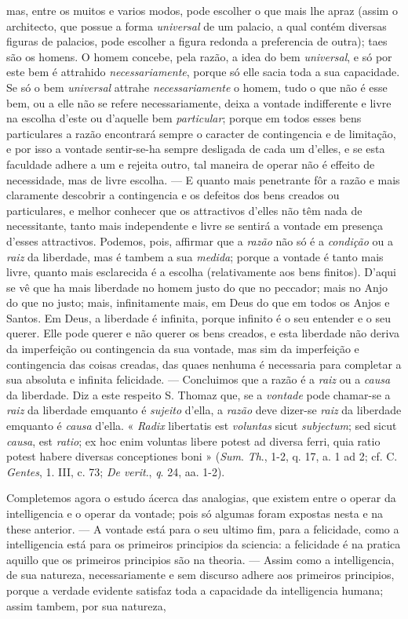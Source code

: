 mas, entre os muitos e varios modos, pode escolher o que mais lhe apraz (assim o architecto, que possue a forma \emph{universal} de um palacio, a qual contém diversas figuras de palacios, pode escolher a figura redonda a preferencia de outra); taes são os homens. O homem concebe, pela razão, a idea do bem \emph{universal}, e só por este bem é attrahido \emph{necessariamente}, porque só elle sacia toda a sua capacidade. Se só o bem \emph{universal} attrahe \emph{necessariamente} o homem, tudo o que não é esse bem, ou a elle não se refere necessariamente, deixa a vontade indifferente e livre na escolha d'este ou d'aquelle bem \emph{particular}; porque em todos esses bens particulares a razão encontrará sempre o caracter de contingencia e de limitação, e por isso a vontade sentir-se-ha sempre desligada de cada um d'elles, e se esta faculdade adhere a um e rejeita outro, tal maneira de operar não é effeito de necessidade, mas de livre escolha. --- E quanto mais penetrante fôr a razão e mais claramente descobrir a contingencia e os defeitos dos bens creados ou particulares, e melhor conhecer que os attractivos d'elles não têm nada de necessitante, tanto mais independente e livre se sentirá a vontade em presença d'esses attractivos. Podemos, pois, affirmar que a \emph{razão} não só é a \emph{condição} ou a \emph{raiz} da liberdade, mas é tambem a sua \emph{medida}; porque a vontade é tanto mais livre, quanto mais esclarecida é a escolha (relativamente aos bens finitos). D'aqui se vê que ha mais liberdade no homem justo do que no peccador; mais no Anjo do que no justo; mais, infinitamente mais, em Deus do que em todos os Anjos e Santos. Em Deus, a liberdade é infinita, porque infinito é o seu entender e o seu querer. Elle pode querer e não querer os bens creados, e esta liberdade não deriva da imperfeição ou contingencia da sua vontade, mas sim da imperfeição e contingencia das coisas creadas, das quaes nenhuma é necessaria para completar a sua absoluta e infinita felicidade. --- Concluimos que a razão é a \emph{raiz} ou a \emph{causa} da liberdade. Diz a este respeito S. Thomaz que, se a \emph{vontade} pode chamar-se a \emph{raiz} da liberdade emquanto é \emph{sujeito} d'ella, a \emph{razão} deve dizer-se \emph{raiz} da liberdade emquanto é \emph{causa} d'ella. « \emph{Radix} libertatis est \emph{voluntas} sicut \emph{subjectum}; sed sicut \emph{causa}, est \emph{ratio}; ex hoc enim voluntas libere potest ad diversa ferri, quia ratio potest habere diversas conceptiones boni » (\emph{Sum}. \emph{Th}., 1-2, q. 17, a. 1 ad 2; cf. C. \emph{Gentes}, 1. III, c. 73; \emph{De verit}., \emph{q}. 24, aa. 1-2).\par Completemos agora o estudo ácerca das analogias, que existem entre o operar da intelligencia e o operar da vontade; pois só algumas foram expostas nesta e na these anterior. --- A vontade está para o seu ultimo fim, para a felicidade, como a intelligencia está para os primeiros principios da sciencia: a felicidade é na pratica aquillo que os primeiros principios são na theoria. --- Assim como a intelligencia, de sua natureza, necessariamente e sem discurso adhere aos primeiros principios, porque a verdade evidente satisfaz toda a capacidade da intelligencia humana; assim tambem, por sua natureza, 